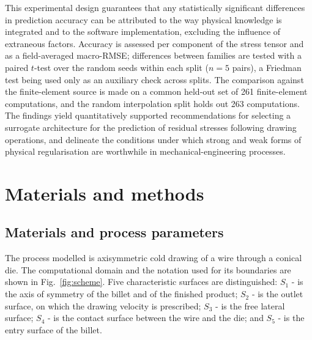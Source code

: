 \documentclass[subscriptcorrection,upint,varvw,barcolor=Goldenrod3,mathalfa=cal=euler,balance,hyphenate,french,pdf-a]{asmejour} %
\begin{document}
This experimental design guarantees that any statistically significant differences in prediction accuracy can be attributed to the way physical knowledge is integrated and to the software implementation, excluding the influence of extraneous factors. Accuracy is assessed per component of the stress tensor and as a field-averaged macro-RMSE; differences between families are tested with a paired $t$-test over the random seeds within each split ($n = 5$ pairs), a Friedman test being used only as an auxiliary check across splits. The comparison against the finite-element source is made on a common held-out set of 261 finite-element computations, and the random interpolation split holds out 263 computations. The findings yield quantitatively supported recommendations for selecting a surrogate architecture for the prediction of residual stresses following drawing operations, and delineate the conditions under which strong and weak forms of physical regularisation are worthwhile in mechanical-engineering processes.



\section{Materials and methods}
\subsection{Materials and process parameters}

The process modelled is axisymmetric cold drawing of a wire through a conical die. The computational domain and the notation used for its boundaries are shown in Fig.~\ref{fig:scheme}. Five characteristic surfaces are distinguished: 
$S_1$ - is the axis of symmetry of the billet and of the finished product; 
$S_2$ - is the outlet surface, on which the drawing velocity is prescribed; 
$S_3$ - is the free lateral surface; 
$S_4$ - is the contact surface between the wire and the die; and $S_5$ - is the entry surface of the billet. 
\end{document}

